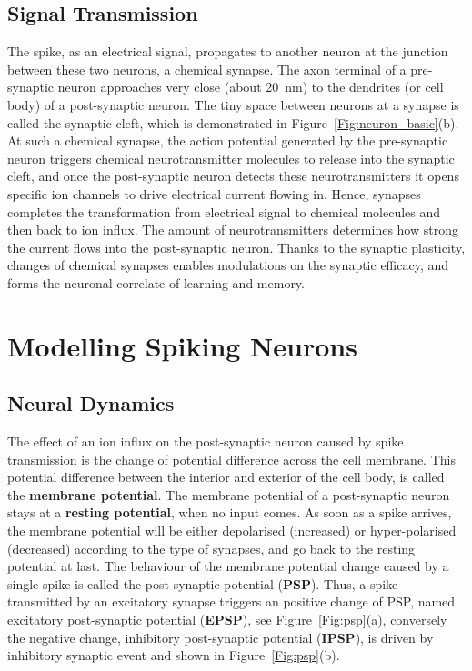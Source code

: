 \subsection{Signal Transmission}
The spike, as an electrical signal, propagates to another neuron at the junction between these two neurons, a chemical synapse.
The axon terminal of a pre-synaptic neuron approaches very close (about 20~nm) to the dendrites (or cell body) of a  post-synaptic neuron.
The tiny space between neurons at a synapse is called the synaptic cleft, which is demonstrated in Figure~\ref{Fig:neuron_basic}(b).
At such a chemical synapse, the action potential generated by the pre-synaptic neuron triggers chemical neurotransmitter molecules to release into the synaptic cleft, and once the post-synaptic neuron detects these neurotransmitters it opens specific ion channels to drive electrical current flowing in.
Hence, synapses completes the transformation from electrical signal to chemical molecules and then back to ion influx.
The amount of neurotransmitters determines how strong the current flows into the post-synaptic neuron.
Thanks to the synaptic plasticity, changes of chemical synapses enables modulations on the synaptic efficacy, and forms the neuronal correlate of learning and memory.

\section{Modelling Spiking Neurons}
\label{sec:spike}
\subsection{Neural Dynamics}
The effect of an ion influx on the post-synaptic neuron caused by spike transmission is the change of potential difference across the cell membrane.
This potential difference between the interior and exterior of the cell body, is called the \textbf{membrane potential}.
The membrane potential of a post-synaptic neuron stays at a \textbf{resting potential}, when no input comes.
As soon as a spike arrives, the membrane potential will be either depolarised (increased) or hyper-polarised (decreased) according to the type of synapses, and go back to the resting potential at last.
The behaviour of the membrane potential change caused by a single spike is called the post-synaptic potential (\textbf{PSP}). 
Thus, a spike transmitted by an excitatory synapse triggers an positive change of PSP, named excitatory post-synaptic potential (\textbf{EPSP}), see Figure~\ref{Fig:psp}(a), conversely the negative change, inhibitory post-synaptic potential (\textbf{IPSP}), is driven by inhibitory synaptic event and shown in Figure~\ref{Fig:psp}(b).


